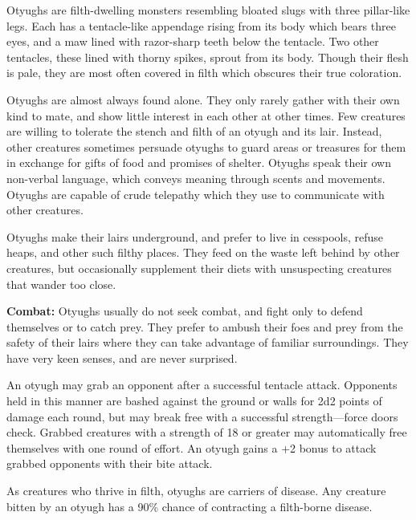 \begin{multicols}{2}
\begin{minipage}{\columnwidth}
\end{minipage}

Otyughs are filth-dwelling monsters resembling bloated slugs with three pillar-like legs. Each has a tentacle-like appendage rising from its body which bears three eyes, and a maw lined with razor-sharp teeth below the tentacle. Two other tentacles, these lined with thorny spikes, sprout from its body. Though their flesh is pale, they are most often covered in filth which obscures their true coloration.

Otyughs are almost always found alone. They only rarely gather with their own kind to mate, and show little interest in each other at other times. Few creatures are willing to tolerate the stench and filth of an otyugh and its lair. Instead, other creatures sometimes persuade otyughs to guard areas or treasures for them in exchange for gifts of food and promises of shelter. Otyughs speak their own non-verbal language, which conveys meaning through scents and movements. Otyughs are capable of crude telepathy which they use to communicate with other creatures.

Otyughs make their lairs underground, and prefer to live in cesspools, refuse heaps, and other such filthy places. They feed on the waste left behind by other creatures, but occasionally supplement their diets with unsuspecting creatures that wander too close.

\textbf{Combat:} Otyughs usually do not seek combat, and fight only to defend themselves or to catch prey. They prefer to ambush their foes and prey from the safety of their lairs where they can take advantage of familiar surroundings. They have very keen senses, and are never surprised.

An otyugh may grab an opponent after a successful tentacle attack. Opponents held in this manner are bashed against the ground or walls for 2d2 points of damage each round, but may break free with a successful strength---force doors check. Grabbed creatures with a strength of 18 or greater may automatically free themselves with one round of effort. An otyugh gains a +2 bonus to attack grabbed opponents with their bite attack.

As creatures who thrive in filth, otyughs are carriers of disease. Any creature bitten by an otyugh has a 90\% chance of contracting a filth-borne disease.

\noindent
\begin{minipage}{\columnwidth}

\vspace{1em}


\end{minipage}
\end{multicols}
